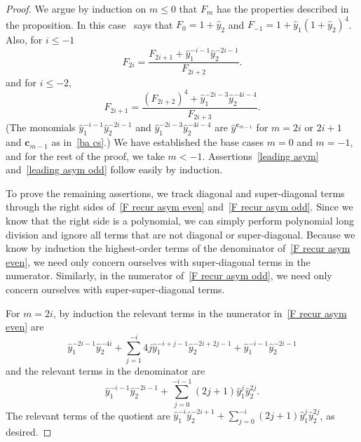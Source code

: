 \documentclass[ALCO,ThmDefs,Unicode,epreuves]{cedram}
\newcommand{\cc}{\mathbf{c}}
\newcommand{\hy}{\hat{y}}
\begin{document}
\begin{proof}
We argue by induction on $m\le0$ that $F_m$ has the properties described in the proposition.
In this case~\cite[Proposition~5.1]{ca4} says that $F_0=1+\hy_2$ and ${F_{-1}=1+\hy_1(1+\hy_2)^4}$.
Also, for $i\le -1$
\begin{equation}\label{F recur asym even}
F_{2i}=\frac{F_{2i+1}+\hy_1^{-i-1}\hy_2^{-2i-1}}{F_{2i+2}}.
\end{equation}
and for $i\le-2$,
\begin{equation}\label{F recur asym odd}
F_{2i+1}=\frac{(F_{2i+2})^4+\hy_1^{-2i-3}\hy_2^{-4i-4}}{F_{2i+3}}.
\end{equation}
(The monomials $\hy_1^{-i-1}\hy_2^{-2i-1}$ and $\hy_1^{-2i-3}\hy_2^{-4i-4}$ are $\hy^{\cc_{m-1}}$ for $m=2i$ or $2i+1$ and $\cc_{m-1}$ as in~\eqref{ba cs}.)
We have established the base cases $m=0$ and $m=-1$, and for the rest of the proof, we take $m<-1$.
Assertions~\ref{leading asym} and~\ref{leading asym odd} follow easily by induction.

To prove the remaining assertions, we track diagonal and super-diagonal terms through the right sides of~\eqref{F recur asym even} and~\eqref{F recur asym odd}.
Since we know that the right side is a polynomial, we can simply perform polynomial long division and ignore all terms that are not diagonal or super-diagonal.
Because we know by induction the highest-order terms of the denominator of~\eqref{F recur asym even}, we need only concern ourselves with super-diagonal terms in the numerator.
Similarly, in the numerator of~\eqref{F recur asym odd}, we need only concern ourselves with super-super-diagonal terms.

For $m=2i$, by induction the relevant terms in the numerator in~\eqref{F recur asym even} are 
\begin{equation}\label{even numer}
\hy_1^{-2i-1}\hy_2^{-4i}+\sum_{j=1}^{-i}4j\hy_1^{-i+j-1}\hy_2^{-2i+2j-1}+\hy_1^{-i-1}\hy_2^{-2i-1}
\end{equation}
and the relevant terms in the denominator are
\begin{equation}\label{even denom}
\hy_1^{-i-1}\hy_2^{-2i-1}+\sum_{j=0}^{-i-1}(2j+1)\hy_1^j\hy_2^{2j}.
\end{equation}
The relevant terms of the quotient are $\hy_1^{-i}\hy_2^{-2i+1}+\sum_{j=0}^{-i}(2j+1)\hy_1^j\hy_2^{2j}$, as desired.


\end{proof}
\end{document}
